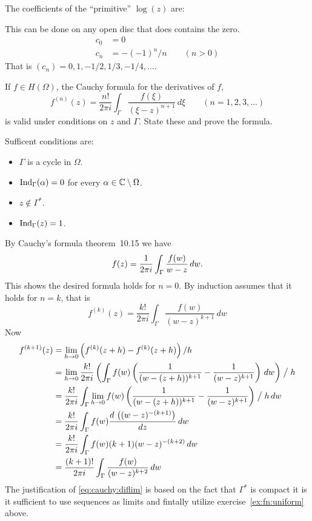 \begin{enumerate}
The coefficients of the ``primitive'' \(\log(z)\) are:

This can be done on any open disc that does contains the zero.
\begin{align*}
c_0 &= 0 \\
c_n &= -(-1)^n/n \qquad (n > 0)
\end{align*}
That is \((c_n)=0,1,-1/2,1/3,-1/4,\ldots\).

\begin{excopy}
If \(f\in H(\Omega)\), the Cauchy formula for the derivatives of $f$,
\begin{equation*}
f^{(n)}(z)
= \frac{n!}{2\pi i} \int_\Gamma \frac{f(\xi)}{(\xi - z)^{n+1}}\,d\xi
\qquad (n=1,2,3,\ldots)
\end{equation*}
is valid under conditions on $z$ and \(\Gamma\).
State these and prove the formula.
\end{excopy}

Sufficent conditions are:
\begin{itemize}
\item \(\Gamma\) is a cycle in \(\Omega\).
\item \(\mathop{\rm Ind}\nolimits_\Gamma(\alpha)=0\) for every \(\alpha\in \mathbb{C}\setminus\Omega\).
\item \(z\notin \Gamma^*\).
\item \(\mathop{\rm Ind}\nolimits_\Gamma(z)=1\).
\end{itemize}
By Cauchy's formula theorem~10.15 we have
\begin{equation*}
f(z) = \frac{1}{2\pi i}\int_\Gamma \frac{f(w)}{w-z}\,dw.
\end{equation*}
This shows the desired formula holds for \(n=0\).
By induction assumes that it holds for \(n=k\), that is
\begin{equation*}
f^{(k)}(z)
= \frac{k!}{2\pi i} \int_\Gamma \frac{f(w)}{(w - z)^{k+1}}\,dw
\end{equation*}
Now
\begin{align}
f^{(k+1)}(z)
&= \lim_{h\to 0} \left(f^{(k)}(z+h)- f^{(k)}(z+h)\right)/h \notag \\
&= \lim_{h\to 0} \frac{k!}{2\pi i} 
   \left(
    \int_\Gamma 
    f(w)
    \left(
       \frac{1}{(w - (z+h))^{k+1}} - \frac{1}{(w - z)^{k+1}}
    \right)\,dw  
    \right) \bigm/ h
    \notag \\
&= \frac{k!}{2\pi i} \int_\Gamma \lim_{h\to 0} 
    f(w)
    \left(
       \frac{1}{(w - (z+h))^{k+1}} - \frac{1}{(w - z)^{k+1}}
    \right)\bigm/h\,dw  \label{eq:cauchy:diflim} \\
&= \frac{k!}{2\pi i} \int_\Gamma 
    f(w) \frac{d\,\left((w-z)^{-(k+1)}\right)}{dz}\,dw  \notag \\
&= \frac{k!}{2\pi i} \int_\Gamma f(w)(k+1)(w-z)^{-(k+2)}\,dw \notag \\
&= \frac{(k+1)!}{2\pi i} \int_\Gamma \frac{f(w)}{(w - z)^{k+2}}\,dw \notag
\end{align}
The justification of \eqref{eq:cauchy:diflim} is based on the fact
that \(\Gamma^*\) is compact it is it sufficient to use
sequences as limits and fintally utilize exercise~\ref{ex:fn:uniform} above.


\end{enumerate}
